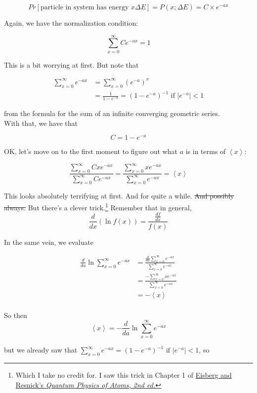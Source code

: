 \documentclass[letterpaper,12pt]{report}
\begin{document}
\[Pr[\text{particle in system has energy }x\Delta E] = P(x; \Delta E) = C\times e^{-ax} \]

Again, we have the normalization condition:

\[\sum_{x=0}^{\infty} Ce^{-ax} = 1 \]

This is a bit worrying at first. But note that

\[\begin{split}
  \sum_{x=0}^{\infty} e^{-ax} &= \sum_{x=0}^{\infty} \left(e^{-a}\right)^x \\
                      &= \frac{1}{1 - e^{-a}} = (1 - e^{-a})^{-1} \text{ if } \left|e^{-a}\right| < 1
\end{split}
\]

from the formula for the sum of an infinite converging geometric series.
\\
With that, we have that

\[ C = 1 - e^{-a} \]

OK, let's move on to the first moment to figure out what \(a\) is in terms of \(\left<x\right>\):

\[
\frac{\sum_{x=0}^{\infty} Cxe^{-ax}} {\sum_{x=0}^{\infty} Ce^{-ax}} 
= \frac{\sum_{x=0}^{\infty} xe^{-ax}} {\sum_{x=0}^{\infty} e^{-ax}}
= \left<x\right>
\]

This looks absolutely terrifying at first. And for quite a while. \sout{And possibly always.}
But there's a clever trick.\footnote
{
  Which I take no credit for. I saw this trick in Chapter 1 of
  \href{http://www.sicyon.com/resources/library/pdf/eisberg_resnick-quantum_physics.pdf}
  {Eisberg and Resnick's \textit{Quantum Physics of Atoms, 2nd ed.}}
}
Remember that in general,
\[\frac{d}{dx}\left(\ln{f(x)}\right) = \frac{\frac{df}{dx}}{f(x)}\]

In the same vein, we evaluate

\[\begin{split}
  \frac{d}{da}\ln{\sum_{x=0}^{\infty} e^{-ax}} &=
  \frac{\frac{d}{da}\sum_{x=0}^{\infty} e^{-ax}} {\sum_{x=0}^{\infty} e^{-ax}} \\
              &= \frac{-\sum_{x=0}^{\infty}xe^{-ax}} {\sum_{x=0}^{\infty} e^{-ax}} \\
              &= -\left<x\right> \\
\end{split}
\]

So then
\[
  \left<x\right> = -\frac{d}{da}\ln{\sum_{x=0}^{\infty} e^{-ax}}
\]

but we already saw that
\(\sum_{x=0}^{\infty} e^{-ax} = (1 - e^{-a})^{-1} \text{ if } \left|e^{-a}\right| < 1 \), so 
\end{document}
